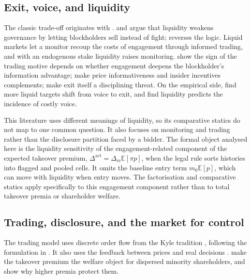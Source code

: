 \documentclass[11pt]{article}
\newcommand{\Eop}{\mathbb{E}}
\newcommand{\Dact}{\Delta^{\mathrm{act}}}
\begin{document}
\subsection{Exit, voice, and liquidity}
\label{sec:lit-exit-voice}

The classic trade-off originates with \citet{Hirschman1970}. \citet{Coffee1991} and
\citet{Bhide1993} argue that liquidity weakens governance by letting blockholders sell instead of
fight; \citet{Maug1998} reverses the logic. Liquid markets let a monitor recoup the costs of
engagement through informed trading, and with an endogenous stake liquidity raises monitoring.
\citet{KahnWinton1998} show the sign of the trading motive depends on whether engagement deepens the
blockholder's information advantage; \citet{FaureGrimaudGromb2004} make price informativeness and
insider incentives complements; \citet{AdmatiPfleiderer2009} make exit itself a disciplining threat.
On the empirical side, \citet{EdmansFangZur2013} find more liquid targets shift from voice to exit,
and \citet{NorliOstergaardSchindele2015} find liquidity predicts the incidence of costly voice.

This literature uses different meanings of liquidity, so its comparative statics do not map to
one common question. It also focuses on monitoring and trading rather than the disclosure
partition faced by a bidder. The formal object analysed here is the liquidity sensitivity of
the engagement-related component of the expected takeover premium, $\Dact = \Delta_m \Eop[\pi p]$,
when the legal rule sorts histories into flagged and pooled cells. It omits the baseline entry
term $m_0 \Eop[p]$, which can move with liquidity when entry moves. The factorisation and
comparative statics apply specifically to this engagement component rather than to total
takeover premia or shareholder welfare.

\subsection{Trading, disclosure, and the market for control}
\label{sec:lit-microstructure}

The trading model uses discrete order flow from the Kyle tradition \citep{Kyle1985,
GlostenMilgrom1985}, following the formulation in \citet{EdmansGoldsteinJiang2015}. It also uses the
feedback between prices and real decisions \citep{EdmansGoldsteinJiang2012, BondEdmansGoldstein2012,
Goldstein2023}. \citet{GrossmanHart1980} make the takeover premium the welfare object for dispersed
minority shareholders, and \citet{BurkartGrombPanunzi1998} show why higher premia protect them.
\end{document}
